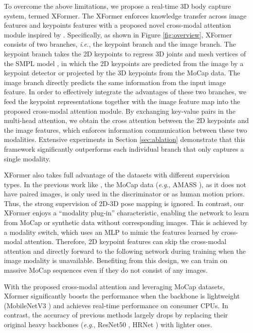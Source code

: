 \documentclass{article}
\newcommand{\ie}{\textit{i}.\textit{e}.}
\newcommand{\eg}{\textit{e}.\textit{g}.}
\begin{document}
To overcome the above limitations, we propose a real-time 3D body capture system, termed XFormer. The XFormer enforces knowledge transfer across image features and keypoints features with a proposed novel cross-modal attention module inspired by \cite{vaswani2017attention,lu2019vilbert}. Specifically, as shown in Figure \ref{fig:overview}, XFormer consists of two branches, \ie, the keypoint branch and the image branch. The keypoint branch takes the 2D keypoints to regress 3D joints and mesh vertices of the SMPL model \cite{SMPL:2015}, in which the 2D keypoints are predicted from the image by a keypoint detector or projected by the 3D keypoints from the MoCap data.
The image branch directly predicts the same information from the input image feature. In order to effectively integrate the advantages of these two branches, we feed the keypoint representations together with the image feature map into the proposed cross-modal attention module. By exchanging key-value pairs in the multi-head attention, we obtain the cross attention between the 2D keypoints and the image features, which enforces information communication between these two modalities. Extensive experiments in Section \ref{sec:ablation} demonstrate that this framework significantly outperforms each individual branch that only captures a single modality.

XFormer also takes full advantage of the datasets with different supervision types. In the previous work like \cite{kocabas2019vibe,kolotouros2021probabilistic,rempe2021humor}, the MoCap data (\eg, AMASS \cite{mahmood2019amass}), as it does not have paired images, is only used in the discriminator or as human motion priors. Thus, the strong supervision of 2D-3D pose mapping is ignored.
In contrast, our XFormer enjoys a ``modality plug-in'' characteristic, enabling the network to learn from MoCap or synthetic data without corresponding images. This is achieved by a modality switch, which uses an MLP to mimic the features learned by cross-modal attention.
Therefore, 2D keypoint features can skip the cross-modal attention and directly forward to the following network during training when the image modality is unavailable. Benefiting from this design, we can train on massive MoCap sequences even if they do not consist of any images.

With the proposed cross-modal attention and leveraging MoCap datasets, Xformer significantly boosts the performance when the backbone is lightweight (MobileNetV3 \cite{howard2019searching}) and achieves  real-time performance on consumer CPUs. In contrast, the accuracy of previous methods \cite{kocabas2019vibe,lin2021-mesh-graphormer,kocabas2021pare} largely drops by replacing their original heavy backbones (\eg, ResNet50 \cite{he2016deep}, HRNet \cite{wang2018high}) with lighter ones.
\end{document}
